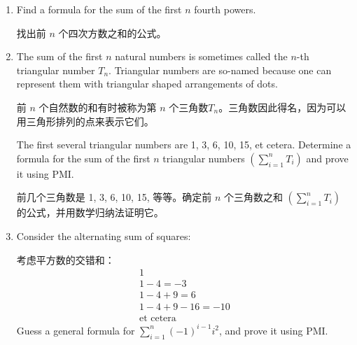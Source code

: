 \begin{enumerate}
{\begin{proof}
   \end{proof}
  }
  
  \wbvfill
  
  \workbookpagebreak
    
  \item Find a formula for the sum of the first $n$ fourth powers.
  
  找出前 $n$ 个四次方数之和的公式。
  
  \wbvfill
  
  \workbookpagebreak
   
  \item The sum of the first $n$ natural numbers is sometimes called
  the $n$-th triangular number $T_n$.
  Triangular numbers are so-named
  because one can represent them with triangular shaped arrangements 
  of dots.
  
  前 $n$ 个自然数的和有时被称为第 $n$ 个三角数$T_n$。三角数因此得名，因为可以用三角形排列的点来表示它们。
  \begin{center}  \end{center}
  
  The first several triangular numbers are 1, 3, 6, 10, 15, et cetera.
  Determine a formula for the sum of the first $n$ triangular numbers $\displaystyle \left( \sum_{i=1}^n T_i \right)$ and prove it using PMI.
  
  前几个三角数是 1, 3, 6, 10, 15, 等等。确定前 $n$ 个三角数之和 $\displaystyle \left( \sum_{i=1}^n T_i \right)$ 的公式，并用数学归纳法证明它。
  
  \wbvfill
  
  \workbookpagebreak
  
  \item Consider the alternating sum of squares:
  
  考虑平方数的交错和：
  \begin{gather*}
  1 \\
  1 - 4 = -3 \\
  1 - 4 + 9 = 6 \\
  1 - 4 + 9 - 16 = -10 \\
  \mbox{et cetera}
  \end{gather*}
  Guess a general formula for $\sum_{i=1}^n (-1)^{i-1} i^2$, and prove it using PMI.
  

\end{enumerate}
